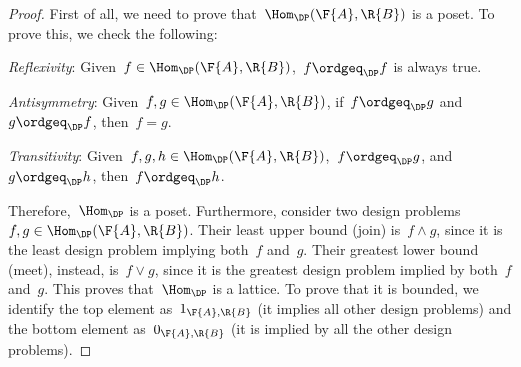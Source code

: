 \begin{proof}
  First of all, we need to prove that~$\Hom_\DP(\F{A},\R{B})$ is a poset. To prove this, we check the following:

  \begin{compactitem}
    \item \emph{Reflexivity}: Given~$f\in \Hom_\DP(\F{A},\R{B})$,~$f\ordgeq_\DP f$ is always true.
    \item \emph{Antisymmetry}: Given~$f,g\in \Hom_\DP(\F{A},\R{B})$, if~$f\ordgeq_\DP g$ and~$g\ordgeq_\DP f$, then~$f=g$.
    \item \emph{Transitivity}: Given~$f,g,h\in \Hom_\DP(\F{A},\R{B})$,~$f\ordgeq_\DP g$, and~$g\ordgeq_\DP h$, then~$f\ordgeq_\DP h$.
  \end{compactitem}
  Therefore,~$\Hom_\DP$ is a poset.
  Furthermore, consider two design problems~$f,g\in \Hom_\DP(\F{A},\R{B})$.
  Their least upper bound (join) is~$f\wedge g$, since it is the least design problem implying both~$f$ and~$g$.
  Their greatest lower bound (meet), instead, is~$f\vee g$, since it is the greatest design problem implied by both~$f$ and~$g$.
  This proves that~$\Hom_\DP$ is a lattice.
  To prove that it is bounded, we identify the top element as~$1_{\F{A},\R{B}}$ (it implies all other design problems) and the bottom element as~$0_{\F{A},\R{B}}$ (it is implied by all the other design problems).
\end{proof}

